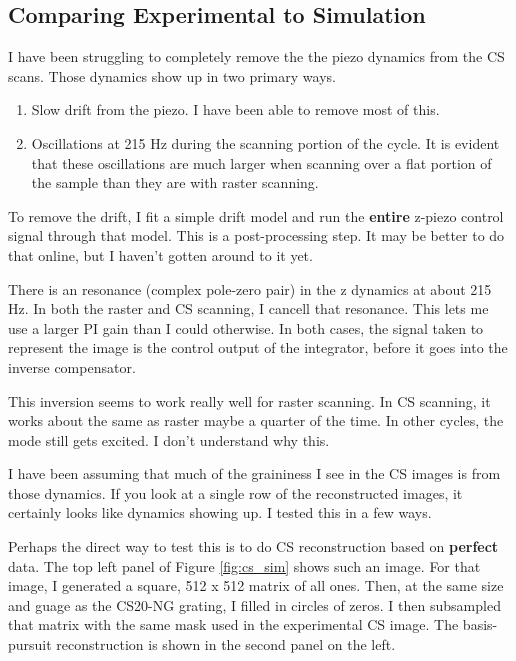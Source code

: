 \documentclass[11pt]{article}
\begin{document}
\subsection{Comparing Experimental to Simulation}
\label{sec:orge9c0c5d}
I have been struggling to completely remove the the piezo dynamics from the CS scans. Those dynamics show up in two primary ways. 

\begin{enumerate}
\item Slow drift from the piezo. I have been able to remove most of this.
\item Oscillations at 215 Hz during the scanning portion of the cycle. It is evident that these oscillations are much larger when scanning over a flat portion of the sample than they are with raster scanning.
\end{enumerate}

To remove the drift, I fit a simple drift model and run the \textbf{entire} z-piezo control signal through that model. This is a post-processing step. It may be better to do that online, but I haven't gotten around to it yet. 

There is an resonance (complex pole-zero pair) in the z dynamics at about 215 Hz. In both the raster and CS scanning, I cancell that resonance. This lets me use a larger PI gain than I could otherwise. In both cases, the signal taken to represent the image is the control output of the integrator, before it goes into the inverse compensator. 

This inversion seems to work really well for raster scanning. In CS scanning, it works about the same as raster maybe a quarter of the time. In other cycles, the mode still gets excited. I don't understand why this.

I have been assuming that much of the graininess I see in the CS images is from those dynamics. If you look at a single row of the reconstructed images, it certainly looks like dynamics showing up. I tested this in a few ways. 

Perhaps the direct way to test this is to do CS reconstruction based on \textbf{perfect} data. The top left panel of Figure \ref{fig:cs_sim} shows such an image. For that image, I generated a square, 512 x 512 matrix of all ones. Then, at the same size and guage as the CS20-NG grating, I filled in circles of zeros. I then subsampled that matrix with the same mask used in the experimental CS image. The basis-pursuit reconstruction is shown in the second panel on the left. 
\end{document}
